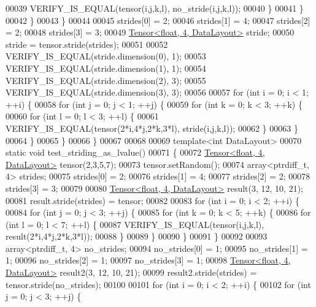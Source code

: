 \begin{DoxyCode}
00039           VERIFY\_IS\_EQUAL(tensor(i,j,k,l), no\_stride(i,j,k,l));
00040         \}
00041       \}
00042     \}
00043   \}
00044 
00045   strides[0] = 2;
00046   strides[1] = 4;
00047   strides[2] = 2;
00048   strides[3] = 3;
00049   \hyperlink{class_eigen_1_1_tensor}{Tensor<float, 4, DataLayout>} stride;
00050   stride = tensor.stride(strides);
00051 
00052   VERIFY\_IS\_EQUAL(stride.dimension(0), 1);
00053   VERIFY\_IS\_EQUAL(stride.dimension(1), 1);
00054   VERIFY\_IS\_EQUAL(stride.dimension(2), 3);
00055   VERIFY\_IS\_EQUAL(stride.dimension(3), 3);
00056 
00057   \textcolor{keywordflow}{for} (\textcolor{keywordtype}{int} i = 0; i < 1; ++i) \{
00058     \textcolor{keywordflow}{for} (\textcolor{keywordtype}{int} j = 0; j < 1; ++j) \{
00059       \textcolor{keywordflow}{for} (\textcolor{keywordtype}{int} k = 0; k < 3; ++k) \{
00060         \textcolor{keywordflow}{for} (\textcolor{keywordtype}{int} l = 0; l < 3; ++l) \{
00061           VERIFY\_IS\_EQUAL(tensor(2*i,4*j,2*k,3*l), stride(i,j,k,l));
00062         \}
00063       \}
00064     \}
00065   \}
00066 \}
00067 
00068 
00069 \textcolor{keyword}{template}<\textcolor{keywordtype}{int} DataLayout>
00070 \textcolor{keyword}{static} \textcolor{keywordtype}{void} test\_striding\_as\_lvalue()
00071 \{
00072   \hyperlink{class_eigen_1_1_tensor}{Tensor<float, 4, DataLayout>} tensor(2,3,5,7);
00073   tensor.setRandom();
00074   array<ptrdiff\_t, 4> strides;
00075   strides[0] = 2;
00076   strides[1] = 4;
00077   strides[2] = 2;
00078   strides[3] = 3;
00079 
00080   \hyperlink{class_eigen_1_1_tensor}{Tensor<float, 4, DataLayout>} result(3, 12, 10, 21);
00081   result.stride(strides) = tensor;
00082 
00083   \textcolor{keywordflow}{for} (\textcolor{keywordtype}{int} i = 0; i < 2; ++i) \{
00084     \textcolor{keywordflow}{for} (\textcolor{keywordtype}{int} j = 0; j < 3; ++j) \{
00085       \textcolor{keywordflow}{for} (\textcolor{keywordtype}{int} k = 0; k < 5; ++k) \{
00086         \textcolor{keywordflow}{for} (\textcolor{keywordtype}{int} l = 0; l < 7; ++l) \{
00087           VERIFY\_IS\_EQUAL(tensor(i,j,k,l), result(2*i,4*j,2*k,3*l));
00088         \}
00089       \}
00090     \}
00091   \}
00092 
00093   array<ptrdiff\_t, 4> no\_strides;
00094   no\_strides[0] = 1;
00095   no\_strides[1] = 1;
00096   no\_strides[2] = 1;
00097   no\_strides[3] = 1;
00098   \hyperlink{class_eigen_1_1_tensor}{Tensor<float, 4, DataLayout>} result2(3, 12, 10, 21);
00099   result2.stride(strides) = tensor.stride(no\_strides);
00100 
00101   \textcolor{keywordflow}{for} (\textcolor{keywordtype}{int} i = 0; i < 2; ++i) \{
00102     \textcolor{keywordflow}{for} (\textcolor{keywordtype}{int} j = 0; j < 3; ++j) \{

\end{DoxyCode}
